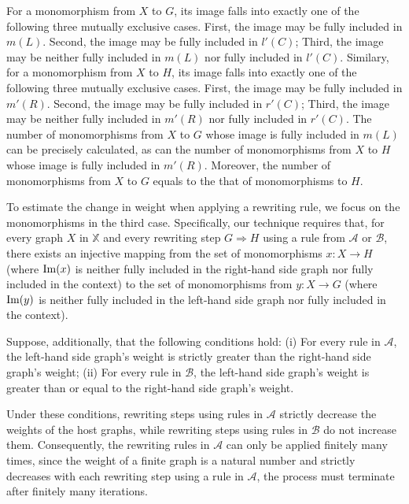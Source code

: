 For a monomorphism from $X$ to $G$, its image falls into exactly one of the following three mutually exclusive cases. First, the image may be fully included in $m(L)$. Second, the image may be fully included in $l'(C)$; Third, the image may be neither fully included in $m(L)$ nor fully included in $l'(C)$. Similary, for a monomorphism from $X$ to $H$, its image falls into exactly one of the following three mutually exclusive cases. First, the image may be fully included in $m'(R)$. Second, the image may be fully included in $r'(C)$; Third, the image may be neither fully included in $m'(R)$ nor fully included in $r'(C)$. The number of monomorphisms from $X$ to $G$ whose image is fully included in $m(L)$ can be precisely calculated, as can the number of monomorphisms from $X$ to $H$ whose image is fully included in $m'(R)$. Moreover, the number of monomorphisms from $X$ to $G$ equals to the that of monomorphisms to $H$. 

To estimate the change in weight when applying a rewriting rule, we focus on 
the monomorphisms in the third case. Specifically, our technique requires that, for every graph $X$ in $\mathbb{X}$ and every rewriting step $G \Rightarrow H$ using a rule from $\mathcal{A}$ or $\mathcal{B}$, there exists an injective mapping from the set of monomorphisms $x : X \to H$ (where $\operatorname{Im}(x)$ is neither fully included in the right-hand side graph nor fully included in the context) to the set of monomorphisms from $y : X \to G$ (where $\operatorname{Im}(y)$ is neither fully included in the left-hand side graph nor fully included in the context). 

Suppose, additionally, that the following conditions hold: (i) For every rule in \( \mathcal{A} \), the left-hand side graph's weight is strictly greater than the right-hand side graph's weight; (ii) For every rule in \( \mathcal{B} \), the left-hand side graph's weight is greater than or equal to the right-hand side graph's weight. 

Under these conditions, rewriting steps using rules in \( \mathcal{A} \) strictly decrease the weights of the host graphs, while rewriting steps using rules in \( \mathcal{B} \) do not increase them.
Consequently, the rewriting rules in \( \mathcal{A} \) can only be applied finitely many times, since the weight of a finite graph is a natural number and strictly decreases with each rewriting step using a rule in \( \mathcal{A} \), the process must terminate after finitely many iterations.  

